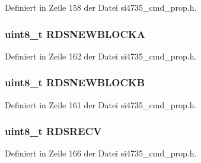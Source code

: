 Definiert in Zeile 158 der Datei si4735\+\_\+cmd\+\_\+prop.\+h.

\hypertarget{unionfm__rds__status__resp1_a62260ece65dc68c2467e5e1b09e5f144}{}
\subsubsection[{R\+D\+S\+N\+E\+W\+B\+L\+O\+C\+K\+A}]{\setlength{\rightskip}{0pt plus 5cm}uint8\+\_\+t R\+D\+S\+N\+E\+W\+B\+L\+O\+C\+K\+A}\label{unionfm__rds__status__resp1_a62260ece65dc68c2467e5e1b09e5f144}


Definiert in Zeile 162 der Datei si4735\+\_\+cmd\+\_\+prop.\+h.

\hypertarget{unionfm__rds__status__resp1_acd71c83a87b1a99a4784dad5f2a9477f}{}
\subsubsection[{R\+D\+S\+N\+E\+W\+B\+L\+O\+C\+K\+B}]{\setlength{\rightskip}{0pt plus 5cm}uint8\+\_\+t R\+D\+S\+N\+E\+W\+B\+L\+O\+C\+K\+B}\label{unionfm__rds__status__resp1_acd71c83a87b1a99a4784dad5f2a9477f}


Definiert in Zeile 161 der Datei si4735\+\_\+cmd\+\_\+prop.\+h.

\hypertarget{unionfm__rds__status__resp1_a56e25cd5c95053ebd95c3c35654680d6}{}
\subsubsection[{R\+D\+S\+R\+E\+C\+V}]{\setlength{\rightskip}{0pt plus 5cm}uint8\+\_\+t R\+D\+S\+R\+E\+C\+V}\label{unionfm__rds__status__resp1_a56e25cd5c95053ebd95c3c35654680d6}


Definiert in Zeile 166 der Datei si4735\+\_\+cmd\+\_\+prop.\+h.

